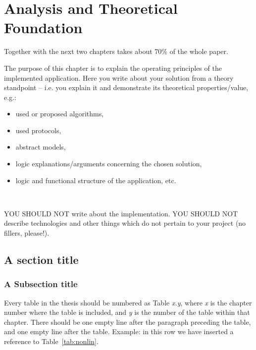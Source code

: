 \chapter{Analysis and Theoretical Foundation}
\label{ch:analysis}
\pagestyle{fancy}

{\color{blue}Together with the next two chapters takes about 70\% of the whole paper.\\}

The purpose of this chapter is to explain the operating principles of the implemented
application.
Here you write about your solution from a theory standpoint – i.e. you explain it and demonstrate its theoretical properties/value, e.g.:
\begin{itemize}
	\item used or proposed algorithms,
    \item used protocols,
    \item  abstract models,
    \item  logic explanations/arguments concerning the chosen solution,
    \item  logic and functional structure of the application, etc.
\end{itemize}


~\\\parbox[c]{\textwidth}{\color{red}\bfseries

YOU SHOULD NOT write about the implementation.
YOU SHOULD NOT describe technologies and other things which do not pertain to
your project (no fillers, please!).
}


\section{A section title}\label{sec:context}

\subsection{A Subsection title}

Every table in the thesis should be numbered as Table \textit{x.y}, where \textit{x} is the chapter number where the table is included, and \textit{y} is the number of the table within that chapter. There should be one empty line after the paragraph preceding the table, and one empty line after the table. Example: in this row we have inserted a reference to Table~\ref{tab:nonlin}.

